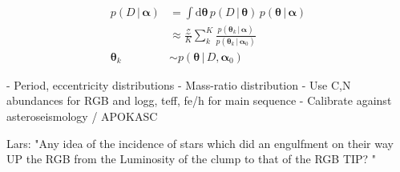 \documentclass[modern]{aastex62}
\newcommand{\given}{\,|\,}
\newcommand{\dd}{\mathrm{d}}
\newcommand{\bs}[1]{\boldsymbol{#1}}
\begin{document}
\begin{align}
    p(D \given \bs{\alpha}) &= \int \dd\bs{\theta} \,
        p(D \given \bs{\theta}) \, p(\bs{\theta} \given \bs{\alpha})\\
    &\approx \frac{\mathcal{Z}}{K} \sum_k^K
        \frac{p(\bs{\theta}_k \given \bs{\alpha})}
            {p(\bs{\theta}_k \given \bs{\alpha}_0)}\\
    \bs{\theta}_k &\sim p(\bs{\theta} \given D, \bs{\alpha}_0)
\end{align}

- Period, eccentricity distributions
- Mass-ratio distribution
     - Use C,N abundances for RGB and logg, teff, fe/h for main sequence
     - Calibrate against asteroseismology / APOKASC


Lars: "Any idea of the incidence of stars which did an engulfment on their way UP the RGB from the Luminosity of the clump to that of the RGB TIP? "


%
%
%
%
%






\end{document}
